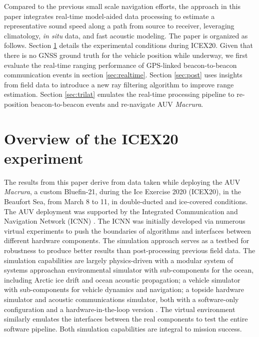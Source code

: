 Compared to the previous small scale navigation efforts, the approach in this paper integrates real-time model-aided data processing to estimate a representative sound speed along a path from source to receiver, leveraging climatology, \textit{in situ} data, and fast acoustic modeling.
The paper is organized as follows.
Section \ref{sec:icex20} details the experimental conditions during ICEX20.
Given that there is no GNSS ground truth for the vehicle position while underway, we first evaluate the real-time ranging performance of GPS-linked beacon-to-beacon communication events in section \ref{sec:realtime}.
Section \ref{sec:post} uses insights from field data to introduce a new ray filtering algorithm to improve range estimation.
Section \ref{sec:trilat} emulates the real-time processing pipeline to re-position beacon-to-beacon events and re-navigate AUV \emph{Macrura}.

\clearpage
\section{Overview of the ICEX20 experiment}\label{sec:icex20}

The results from this paper derive from data taken while deploying the AUV \emph{Macrura}, a custom Bluefin-21, during the Ice Exercise 2020 (ICEX20), in the Beaufort Sea, from March 8 to 11, in double-ducted and ice-covered conditions.
The AUV deployment was supported by the Integrated Communication and Navigation Network (ICNN) \citep{schneider_self-adapting_2020,randeni_construction_2020,randeni_high-resolution_2021}.
The ICNN was initially developed via numerous virtual experiments to push the boundaries of algorithms and interfaces between different hardware components.
The simulation approach serves as a testbed for robustness to produce better results than post-processing previous field data.
The simulation capabilities are largely physics-driven with a modular system of systems approach\textemdash an environmental simulator with sub-components for the ocean, including Arctic ice drift and ocean acoustic propagation; a vehicle simulator with sub-components for vehicle dynamics and navigation; a topside hardware simulator and acoustic communications simulator, both with a software-only configuration and a hardware-in-the-loop version \citep{schneider_netsim_2018}.
The virtual environment similarly emulates the interfaces between the real components to test the entire software pipeline.
Both simulation capabilities are integral to mission success.

